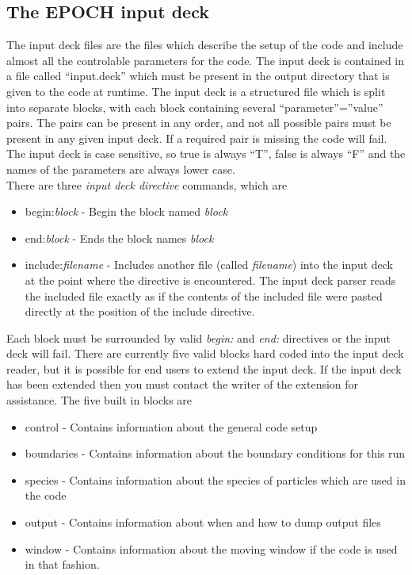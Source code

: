 \documentclass[12pt]{article}
\newcommand{\nEPOCH}{{\color{warwickdark}\fontfamily{phv}\selectfont EPOCH}}
\newcommand{\EPOCH}{{\nEPOCH} }
\begin{document}
\subsection{The \EPOCH input deck}
The input deck files are the files which describe the setup of the code and
include almost all the controlable parameters for the code. The input deck is
contained in a file called ``input.deck'' which must be present in the output
directory that is given to the code at runtime. The input deck is a structured
file which is split into separate blocks, with each block containing several
``parameter''=''value'' pairs. The pairs can be present in any order, and not
all possible pairs must be present in any given input deck. If a required pair
is missing the code will fail. The input deck is case sensitive, so true is
always ``T'', false is always ``F'' and the names of the parameters are always
lower case.\\

There are three {\it input deck directive} commands, which are
\begin{itemize}
\item begin:{\it block} - Begin the block named {\it block}
\item end:{\it block} - Ends the block names {\it block}
\item include:{\it filename} - Includes another file (called {\it filename})
  into the input deck at the point where the directive is encountered. The
  input deck parser reads the included file exactly as if the contents of the
  included file were pasted directly at the position of the include directive.
\end{itemize}
Each block must be surrounded by valid {\it begin:} and {\it end:} directives
or the input deck will fail. There are currently five valid blocks hard coded
into the input deck reader, but it is possible for end users to extend the
input deck. If the input deck has been extended then you must contact the
writer of the extension for assistance. The five built in blocks are
\begin{itemize}
\item control - Contains information about the general code setup
\item boundaries - Contains information about the boundary conditions for this
  run
\item species - Contains information about the species of particles which are
  used in the code
\item output - Contains information about when and how to dump output files
\item window - Contains information about the moving window if the code is
  used in that fashion.
\end{itemize}
\end{document}
